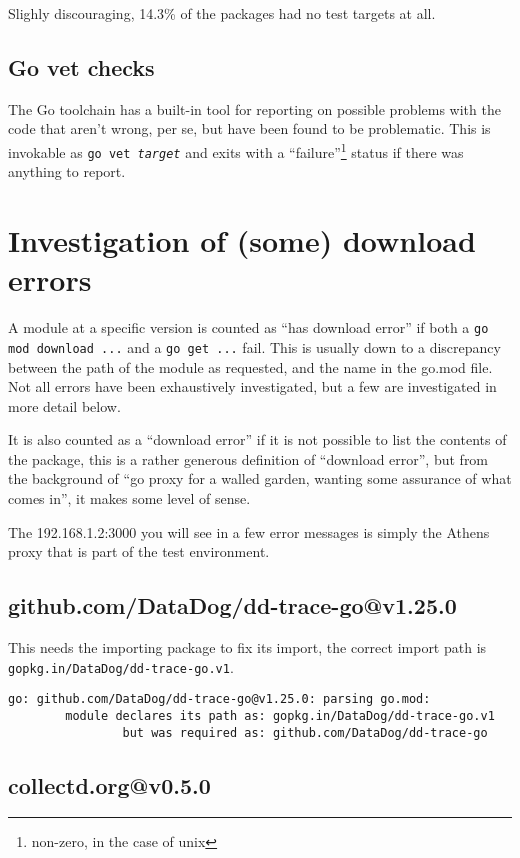 \documentclass[a4paper]{paper}
\begin{document}
Slighly discouraging, 14.3\% of the packages had no test targets at all.

\subsection{Go vet checks}

The Go toolchain has a built-in tool for reporting on possible
problems with the code that aren't wrong, per se, but have been found
to be problematic. This is invokable as {\tt go vet {\it target}}
and exits with a ``failure''\footnote{non-zero, in the case of unix}
status if there was anything to report.

\section{Investigation of (some) download errors}

A module at a specific version is counted as ``has download error'' if
both a {\tt go mod download ...} and a {\tt go get ...} fail. This is
usually down to a discrepancy between the path of the module as
requested, and the name in the go.mod file. Not all errors have been
exhaustively investigated, but a few are investigated in more detail
below.

It is also counted as a ``download error'' if it is not possible to
list the contents of the package, this is a rather generous definition
of ``download error'', but from the background of ``go proxy for a
walled garden, wanting some assurance of what comes in'', it makes
some level of sense.

The 192.168.1.2:3000 you will see in a few error messages is simply
the Athens proxy that is part of the test environment.

\subsection{github.com/DataDog/dd-trace-go@v1.25.0}

This needs the importing package to fix its import, the correct import path is {\tt gopkg.in/DataDog/dd-trace-go.v1}.
\begin{verbatim}
go: github.com/DataDog/dd-trace-go@v1.25.0: parsing go.mod:
        module declares its path as: gopkg.in/DataDog/dd-trace-go.v1
                but was required as: github.com/DataDog/dd-trace-go
\end{verbatim}


\subsection{collectd.org@v0.5.0}
\end{document}
